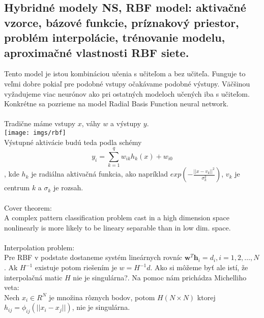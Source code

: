 \documentclass{article}
\numberwithin{equation}{section} %
\begin{document}
\subsection{Hybridné modely NS, RBF model: aktivačné vzorce, bázové funkcie, príznakový priestor, problém interpolácie, trénovanie modelu, aproximačné vlastnosti RBF siete.}
Tento model je istou kombináciou učenia s učiteľom a bez učiteľa. Funguje to veľmi dobre pokiaľ pre podobné vstupy očakávame podobné výstupy. Väčšinou vyžadujeme viac neurónov ako pri ostatných modeloch učených iba s učiteľom. Konkrétne sa pozrieme na model Radial Basis Function neural network.
\\\\
Tradične máme vstupy $x$, váhy $w$ a výstupy $y$.\\
\texttt{[image: imgs/rbf]}\\
Výstupné aktivácie budú teda podla schémy
 $$y_i = \sum^q_{k=1}w_{ik}h_k(x) + w_{i0} $$, kde $h_k$ je radiálna aktivačná funkcia, ako napríklad $exp(-\frac{||x-v_k||^2}{\sigma_k^2})$, $v_k$ je centrum $k$ a $\sigma_k$ je rozsah. 
\\\\
Cover theorem: \\
A complex pattern classification problem cast in a high dimension space nonlinearly is more likely to be lineary separable than in low dim. space.
\\\\
Interpolation problem:\\
Pre RBF v podstate dostaneme systém lineárnych rovníc $\textbf{w}^T\textbf{h}_i = d_i, i=1,2,\dots,N$. Ak $H^{-1}$ existuje potom riešením je $w = H^{-1}d$. Ako si môžeme byť ale istí, že interpolačná matic $H$ nie je singulárna?. Na pomoc nám prichádza Michelliho veta: \\

Nech $x_i \in R^N$ je množina rôznych bodov, potom $H(N\times N)$ ktorej $h_{ij} = \phi_{ij}(||x_i - x_j||)$, nie je singulárna. 
\end{document}
